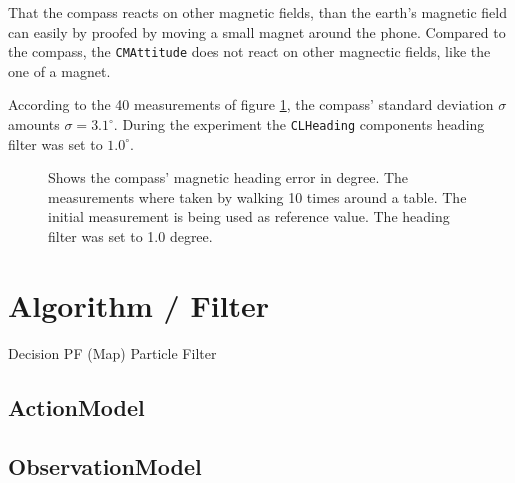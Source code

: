 That the compass reacts on other magnetic fields, than the earth's magnetic field can easily by proofed by moving a small magnet around the phone.
Compared to the compass, the \texttt{CMAttitude} does not react on other magnectic fields, like the one of a magnet.

According to the 40 measurements of figure \ref{fig:eval:compass}, the compass' standard deviation $\sigma$ amounts $\sigma = 3.1^{\circ}$.
During the experiment the \texttt{CLHeading} components heading filter was set to $1.0^{\circ}$.

\begin{figure}[htbp]

  \caption{Shows the compass' magnetic heading error in degree. The measurements where taken by walking 10 times around a table. The initial measurement is being used as reference value. The heading filter was set to 1.0 degree.}
  \label{fig:eval:compass}
\end{figure}



\chapter{Algorithm / Filter} \label{chap:pf}
Decision PF (Map)
Particle Filter
\section{ActionModel}
\section{ObservationModel}

